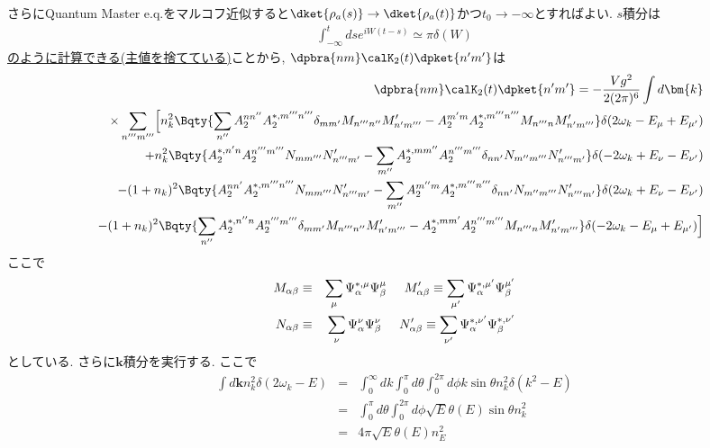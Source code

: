 \documentclass[10.5pt,a4paper]{jreport}
\begin{document}
さらにQuantum Master e.q.をマルコフ近似すると$\dket{\rho_a(s)}\rightarrow\dket{\rho_a(t)}$かつ$t_0\rightarrow -\infty$とすればよい. $s$積分は
\begin{eqnarray}
  \int_{-\infty}^t ds e^{iW(t-s)} \simeq \pi\delta(W)
\end{eqnarray}
\underline{のように計算できる(主値を捨てている)}ことから, $\dpbra{nm}\calK_2(t)\dpket{n'm'}$は
\begin{eqnarray}
  &&\dpbra{nm}\calK_2(t)\dpket{n'm'} = -\frac{Vg^2}{2(2\pi)^6}\int d\bm{k}\\
  \nonumber  &&\times\sum_{n'''m'''}\Bigl[ n_k^2\Bqty{\sum_{n''}A_2^{nn''}A_2^{*, m'''n'''}\delta_{mm'}M_{n'''n''}M_{n'm'''}' - A_2^{m'm}A_2^{*, m'''n'''}M_{n'''n}M_{n'm'''}'}\delta(2\omega_k - E_\mu + E_{\mu'})\\
    \nonumber &&\ \ + n_k^2\Bqty{A_2^{*, n'n}A_2^{n'''m'''}N_{mm'''}N_{n'''m'}' - \sum_{m''}A_2^{*, mm''}A_2^{n'''m'''}\delta_{nn'}N_{m''m'''}N_{n'''m'}'}\delta(-2\omega_k + E_\nu - E_{\nu'})\\
    \nonumber &&- (1 + n_k)^2\Bqty{A_2^{nn'}A_2^{*, m'''n'''}N_{mm'''}N_{n'''m'}' - \sum_{m''}A_2^{m''m}A_2^{*, m'''n'''}\delta_{nn'}N_{m''m'''}N_{n'''m'}'}\delta(2\omega_k + E_\nu - E_{\nu'})\\
    \nonumber&&-(1+n_k)^2\Bqty{\sum_{n''}A_2^{*, n''n}A_2^{n'''m'''}\delta_{mm'}M_{n'''n''}M_{n'm'''}' - A_2^{*, mm'}A_2^{n'''m'''}M_{n'''n}M_{n'm'''}'}\delta(-2\omega_k - E_\mu + E_{\mu'})\Bigr]\\
\end{eqnarray}
ここで
\begin{eqnarray}
  M_{\alpha\beta} &\equiv& \sum_\mu \Psi_\alpha^{*, \mu}\Psi_\beta^{\mu}\hspace{0.5cm}M_{\alpha\beta}' \equiv \sum_{\mu'} \Psi_\alpha^{*, \mu'}\Psi_\beta^{\mu'}\\
  N_{\alpha\beta} &\equiv& \sum_\nu \Psi_\alpha^{\nu}\Psi_\beta^{\nu}\hspace{0.5cm}N_{\alpha\beta}' \equiv \sum_{\nu'} \Psi_\alpha^{*, \nu'}\Psi_\beta^{*, \nu'}
\end{eqnarray}
としている. さらに$\bm{k}$積分を実行する. ここで
\begin{eqnarray}
  \int d\bm{k} n_k^2\delta(2\omega_k - E) &=& \int_0^\infty dk\int_0^\pi d\theta \int_0^{2\pi}d\phi k\sin{\theta}n_k^2\delta(k^2 - E) \\
  &=& \int_0^\pi d\theta \int_0^{2\pi}d\phi \sqrt{E}\theta(E)\sin{\theta}n_k^2\\
  &=& 4\pi\sqrt{E}\theta(E)n_E^2
\end{eqnarray}
\end{document}
